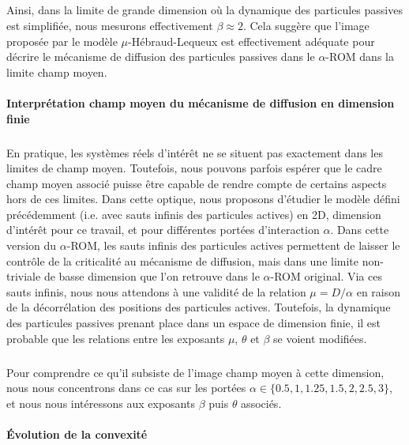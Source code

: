 \subparagraph{}Ainsi, dans la limite de grande dimension où la dynamique des particules passives est simplifiée, nous mesurons effectivement $\beta \approx 2$. Cela suggère que l'image proposée par le modèle $\mu$-Hébraud-Lequeux est effectivement adéquate pour décrire le mécanisme de diffusion des particules passives dans le $\alpha$-ROM dans la limite champ moyen.

\paragraph{Interprétation champ moyen du mécanisme de diffusion en dimension finie}

\subparagraph{}En pratique, les systèmes réels d'intérêt ne se situent pas exactement dans les limites de champ moyen. Toutefois, nous pouvons parfois espérer que le cadre champ moyen associé puisse être capable de rendre compte de certains aspects hors de ces limites. Dans cette optique, nous proposons d'étudier le modèle défini précédemment (i.e. avec sauts infinis des particules actives) en 2D, dimension d'intérêt pour ce travail, et pour différentes portées d'interaction $\alpha$. Dans cette version du $\alpha$-ROM, les sauts infinis des particules actives permettent de laisser le contrôle de la criticalité au mécanisme de diffusion, mais dans une limite non-triviale de basse dimension que l'on retrouve dans le $\alpha$-ROM original. Via ces sauts infinis, nous nous attendons à une validité de la relation $\mu = D/\alpha$ en raison de la décorrélation des positions des particules actives. Toutefois, la dynamique des particules passives prenant place dans un espace de dimension finie, il est probable que les relations entre les exposants $\mu$, $\theta$ et $\beta$ se voient modifiées. 

\subparagraph{}Pour comprendre ce qu'il subsiste de l'image champ moyen à cette dimension, nous nous concentrons dans ce cas sur les portées $\alpha \in \{ 0.5, 1, 1.25, 1.5, 2, 2.5, 3 \}$, et nous nous intéressons aux exposants $\beta$ puis $\theta$ associés.

\paragraph{Évolution de la convexité}

\label{sec:sautsinfinis}

